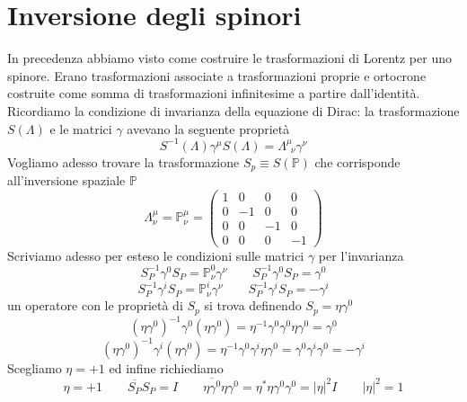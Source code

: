 \section{Inversione degli spinori}
In precedenza abbiamo visto come costruire le trasformazioni di Lorentz per uno spinore. Erano trasformazioni associate a trasformazioni proprie e ortocrone costruite come somma di trasformazioni infinitesime a partire dall'identità. Ricordiamo la condizione di invarianza della equazione di Dirac: la trasformazione $S(\Lambda)$ e le matrici $\gamma$ avevano la seguente proprietà
$$
S^{-1}(\Lambda)\gamma^\mu S(\Lambda) = \Lambda^\mu_{\,\,\,\nu} \gamma^\nu
$$
Vogliamo adesso trovare la trasformazione $S_p\equiv S(\mathbb{P})$ che corrisponde all'inversione spaziale $\mathbb{P}$
$$
\Lambda^\mu_\nu = \mathbb{P}^\mu_\nu = \begin{pmatrix} 1 & 0 & 0 & 0 \\ 0 & -1 & 0 & 0 \\ 0 & 0 & -1 & 0 \\ 0 & 0 & 0 & -1 \end{pmatrix}
$$
Scriviamo adesso per esteso le condizioni sulle matrici $\gamma$ per l'invarianza
$$
S_P^{-1}\gamma^0 S_P = \mathbb{P}^0_\nu \gamma^\nu \qquad S_P^{-1}\gamma^0 S_P = \gamma^0
$$
$$
S_P^{-1}\gamma^i S_P = \mathbb{P}^i_\nu \gamma^\nu \qquad S_P^{-1}\gamma^i S_P = -\gamma^i
$$
un operatore con le proprietà di $S_p$ si trova definendo $S_p=\eta\gamma^0$
$$
(\eta\gamma^0)^{-1}\gamma^0(\eta\gamma^0) = \eta^{-1}\gamma^0\gamma^0\eta\gamma^0 = \gamma^0
$$
$$
(\eta\gamma^0)^{-1}\gamma^i(\eta\gamma^0) = \eta^{-1}\gamma^0\gamma^i\eta\gamma^0 = \gamma^0\gamma^i\gamma^0 = -\gamma^i
$$
Scegliamo $\eta=+1$ ed infine richiediamo
$$
\eta = +1 \qquad \overline{S_P}S_P = I \qquad \overline{\eta\gamma^0}\eta\gamma^0 = \eta^*\eta\gamma^0\gamma^0 = |\eta|^2 I \qquad |\eta|^2 = 1
$$
